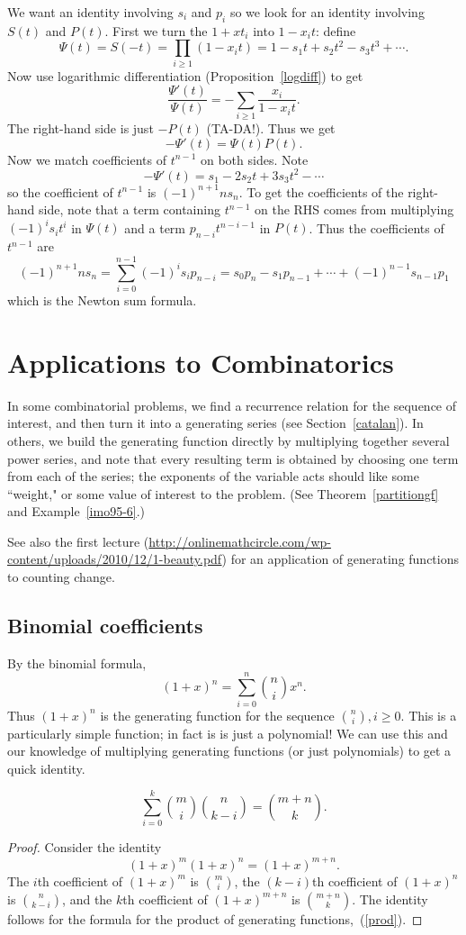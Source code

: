 We want an identity involving $ s_i$ and $ p_i$ so we look for an identity involving $ S(t)$ and $ P(t)$. First we turn the $ 1+xt_i$ into $ 1-x_it$: define
\[\Psi(t)=S(-t)=\prod_{i\geq 1} (1-x_it)=1-s_1t+s_2t^2-s_3t^3+\cdots.\]
Now use logarithmic differentiation (Proposition~\ref{logdiff}) to get
\[\frac{\Psi'(t)}{\Psi(t)}=-\sum_{i\geq 1} \frac{x_i}{1-x_it}.\]
The right-hand side is just $ -P(t)$ (TA-DA!). Thus we get
\[ -\Psi'(t)=\Psi(t)P(t).\]
Now we match coefficients of $ t^{n-1}$ on both sides. Note
\[ -\Psi'(t)=s_1-2s_2t+3s_3t^2-\cdots\]
so the coefficient of $ t^{n-1}$ is $ (-1)^{n+1}n s_n$. To get the coefficients of the right-hand side, note that a term containing $ t^{n-1}$ on the RHS comes from multiplying $ (-1)^is_it^i$ in $ \Psi(t)$ and a term $ p_{n-i}t^{n-i-1}$ in $ P(t)$. Thus the coefficients of $ t^{n-1}$ are
\[ (-1)^{n+1}ns_n=\sum_{i=0}^{n-1}(-1)^is_ip_{n-i}=s_0p_n-s_1p_{n-1}+\cdots +(-1)^{n-1}s_{n-1}p_1\]
which is the Newton sum formula.

\section{Applications to Combinatorics}\label{comb}
In some combinatorial problems, we find a recurrence relation for the sequence of interest, and then turn it into a generating series (see Section~\ref{catalan}). In others, we build the generating function directly by multiplying together several power series, and note that every resulting term is obtained by choosing one term from each of the series; the exponents of the variable acts should like some ``weight," or some value of interest to the problem. (See Theorem~\ref{partitiongf} and Example~\ref{imo95-6}.)

See also the first lecture (\url{http://onlinemathcircle.com/wp-content/uploads/2010/12/1-beauty.pdf}) for an application of generating functions to counting change.

\subsection{Binomial coefficients}
By the binomial formula,
\[
(1+x)^n=\sum_{i=0}^n \binom ni x^n.
\]
Thus $(1+x)^n$ is the generating function for the sequence $\binom ni, i\ge 0$. This is a particularly simple function; in fact is is just a polynomial! We can use this and our knowledge of multiplying generating functions (or just polynomials) to get a quick identity.
\begin{ex}
\[
\sum_{i=0}^k\binom mi\binom n{k-i}=\binom {m+n}{k}.
\]
\end{ex}
\begin{proof}
Consider the identity
\[
(1+x)^m(1+x)^n=(1+x)^{m+n}.
\]
The $i$th coefficient of $(1+x)^m$ is $\binom mi$, the $(k-i)$th coefficient of $(1+x)^n$ is $\binom n{k-i}$, and the $k$th coefficient of $(1+x)^{m+n}$ is $\binom {m+n}{k}$. The identity follows for the formula for the product of generating functions,~(\ref{prod}).
\end{proof}
